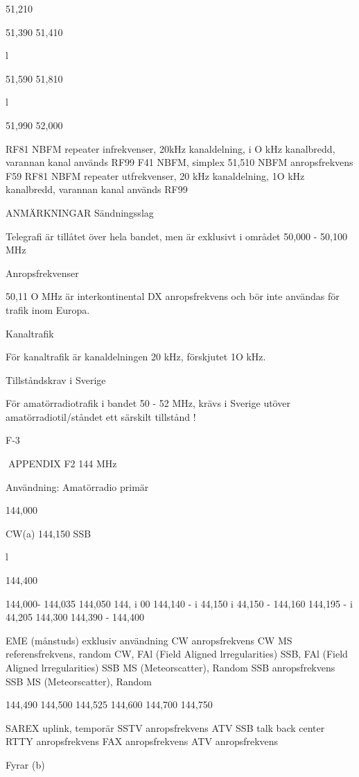 
51,210

51,390
51,410

l

51,590
51,810

l

51,990
52,000



RF81
NBFM repeater infrekvenser, 20kHz kanaldelning, i O kHz kanalbredd, varannan kanal används
RF99
F41
NBFM, simplex
51,510
NBFM anropsfrekvens
F59
RF81
NBFM repeater utfrekvenser, 20 kHz kanaldelning, 1O kHz kanalbredd, varannan kanal används
RF99

ANMÄRKNINGAR
Sändningsslag

Telegrafi är tillåtet över hela bandet, men är exklusivt i området 50,000 - 50,100 MHz

Anropsfrekvenser

50,11 O MHz är interkontinental DX anropsfrekvens och bör inte användas för trafik inom Europa.

Kanaltrafik

För kanaltrafik är kanaldelningen 20 kHz, förskjutet 1O kHz.

Tillståndskrav i Sverige

För amatörradiotrafik i bandet 50 - 52 MHz, krävs i Sverige utöver amatörradiotil/ståndet ett särskilt tillstånd !

F-3

APPENDIX F2
144 MHz

Användning: Amatörradio primär

144,000

CW(a)
144,150
SSB

l

144,400

144,000- 144,035
144,050
144, i 00
144,140 - i 44,150
i 44,150 - 144,160
144,195 - i 44,205
144,300
144,390 - 144,400

EME (månstuds) exklusiv användning
CW anropsfrekvens
CW MS referensfrekvens, random
CW, FAl (Field Aligned lrregularities)
SSB, FAl (Field Aligned lrregularities)
SSB MS (Meteorscatter), Random
SSB anropsfrekvens
SSB MS (Meteorscatter), Random

144,490
144,500
144,525
144,600
144,700
144,750

SAREX uplink, temporär
SSTV anropsfrekvens
ATV SSB talk back center
RTTY anropsfrekvens
FAX anropsfrekvens
ATV anropsfrekvens

Fyrar (b)

